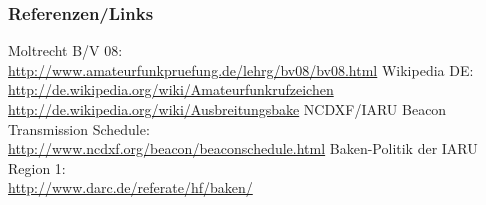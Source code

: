 \begin{frame}
    \frametitle{Referenzen/Links}
    \hypertarget{refs}{}
    \footnotesize

    \begin{thebibliography}{}
         Moltrecht B/V 08: \\
                        \url{http://www.amateurfunkpruefung.de/lehrg/bv08/bv08.html}
            Wikipedia DE: \\
                        \url{http://de.wikipedia.org/wiki/Amateurfunkrufzeichen} \\
                        \url{http://de.wikipedia.org/wiki/Ausbreitungsbake}
           NCDXF/IARU Beacon Transmission Schedule: \\
                        \url{http://www.ncdxf.org/beacon/beaconschedule.html}
          Baken-Politik der IARU Region 1: \\
                        \url{http://www.darc.de/referate/hf/baken/}
    \end{thebibliography} 
   
\end{frame}


